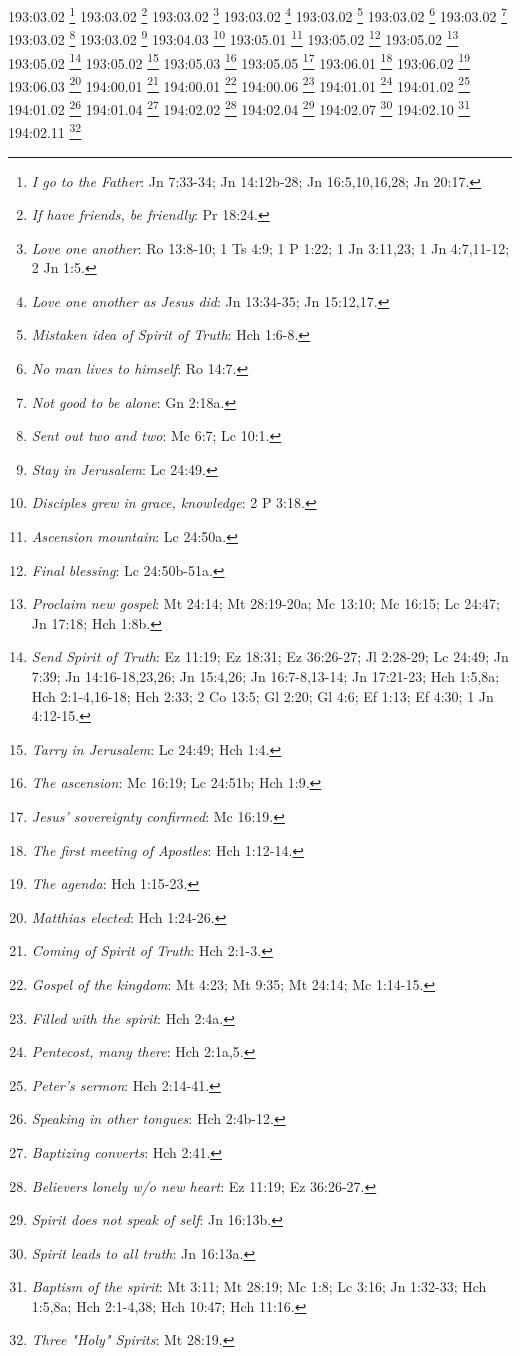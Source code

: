 193:03.02 \footnote{\textit{I go to the Father}: Jn 7:33-34; Jn 14:12b-28; Jn 16:5,10,16,28; Jn 20:17.}
193:03.02 \footnote{\textit{If have friends, be friendly}: Pr 18:24.}
193:03.02 \footnote{\textit{Love one another}: Ro 13:8-10; 1 Ts 4:9; 1 P 1:22; 1 Jn 3:11,23; 1 Jn 4:7,11-12; 2 Jn 1:5.}
193:03.02 \footnote{\textit{Love one another as Jesus did}: Jn 13:34-35; Jn 15:12,17.}
193:03.02 \footnote{\textit{Mistaken idea of Spirit of Truth}: Hch 1:6-8.}
193:03.02 \footnote{\textit{No man lives to himself}: Ro 14:7.}
193:03.02 \footnote{\textit{Not good to be alone}: Gn 2:18a.}
193:03.02 \footnote{\textit{Sent out two and two}: Mc 6:7; Lc 10:1.}
193:03.02 \footnote{\textit{Stay in Jerusalem}: Lc 24:49.}
193:04.03 \footnote{\textit{Disciples grew in grace, knowledge}: 2 P 3:18.}
193:05.01 \footnote{\textit{Ascension mountain}: Lc 24:50a.}
193:05.02 \footnote{\textit{Final blessing}: Lc 24:50b-51a.}
193:05.02 \footnote{\textit{Proclaim new gospel}: Mt 24:14; Mt 28:19-20a; Mc 13:10; Mc 16:15; Lc 24:47; Jn 17:18; Hch 1:8b.}
193:05.02 \footnote{\textit{Send Spirit of Truth}: Ez 11:19; Ez 18:31; Ez 36:26-27; Jl 2:28-29; Lc 24:49; Jn 7:39; Jn 14:16-18,23,26; Jn 15:4,26; Jn 16:7-8,13-14; Jn 17:21-23; Hch 1:5,8a; Hch 2:1-4,16-18; Hch 2:33; 2 Co 13:5; Gl 2:20; Gl 4:6; Ef 1:13; Ef 4:30; 1 Jn 4:12-15.}
193:05.02 \footnote{\textit{Tarry in Jerusalem}: Lc 24:49; Hch 1:4.}
193:05.03 \footnote{\textit{The ascension}: Mc 16:19; Lc 24:51b; Hch 1:9.}
193:05.05 \footnote{\textit{Jesus' sovereignty confirmed}: Mc 16:19.}
193:06.01 \footnote{\textit{The first meeting of Apostles}: Hch 1:12-14.}
193:06.02 \footnote{\textit{The agenda}: Hch 1:15-23.}
193:06.03 \footnote{\textit{Matthias elected}: Hch 1:24-26.}
194:00.01 \footnote{\textit{Coming of Spirit of Truth}: Hch 2:1-3.}
194:00.01 \footnote{\textit{Gospel of the kingdom}: Mt 4:23; Mt 9:35; Mt 24:14; Mc 1:14-15.}
194:00.06 \footnote{\textit{Filled with the spirit}: Hch 2:4a.}
194:01.01 \footnote{\textit{Pentecost, many there}: Hch 2:1a,5.}
194:01.02 \footnote{\textit{Peter's sermon}: Hch 2:14-41.}
194:01.02 \footnote{\textit{Speaking in other tongues}: Hch 2:4b-12.}
194:01.04 \footnote{\textit{Baptizing converts}: Hch 2:41.}
194:02.02 \footnote{\textit{Believers lonely w/o new heart}: Ez 11:19; Ez 36:26-27.}
194:02.04 \footnote{\textit{Spirit does not speak of self}: Jn 16:13b.}
194:02.07 \footnote{\textit{Spirit leads to all truth}: Jn 16:13a.}
194:02.10 \footnote{\textit{Baptism of the spirit}: Mt 3:11; Mt 28:19; Mc 1:8; Lc 3:16; Jn 1:32-33; Hch 1:5,8a; Hch 2:1-4,38; Hch 10:47; Hch 11:16.}
194:02.11 \footnote{\textit{Three "Holy" Spirits}: Mt 28:19.}
